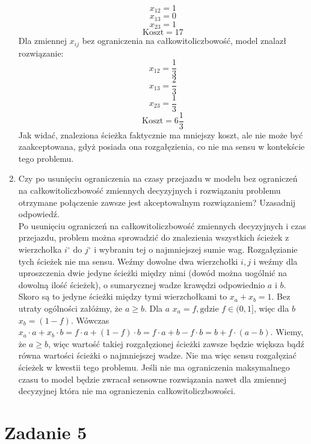 \documentclass{article}
\begin{document}
\begin{enumerate}[label=(\alph*)]
        \[x_{12} = 1\]
        \[x_{13} = 0\]
        \[x_{23} = 1\]
        \[\text{Koszt} = 17\]
        Dla zmiennej $x_{ij}$ bez ograniczenia na całkowitoliczbowość, model znalazł rozwiązanie:
        \[x_{12} = \frac{1}{3}\]
        \[x_{13} = \frac{2}{3}\]
        \[x_{23} = \frac{1}{3}\]
        \[\text{Koszt} = 6\frac{1}{3}\]
        Jak widać, znaleziona ścieżka faktycznie ma mniejszy koszt, ale nie może być zaakceptowana, gdyż posiada ona rozgałęzienia, co nie ma sensu w kontekście tego problemu.
    \item Czy po usunięciu ograniczenia na czasy przejazdu w modelu bez ograniczeń na całkowitoliczbowość zmiennych decyzyjnych i rozwiązaniu problemu otrzymane połączenie zawsze jest akceptowalnym rozwiązaniem? Uzasadnij odpowiedź.\\[0.2 cm]
    Po usunięciu ograniczeń na całkowitoliczbowość zmiennych decyzyjnych i czas przejazdu, problem można sprowadzić do znalezienia wszystkich ścieżek z wierzchołka $i^\circ$ do $j^\circ$ i wybraniu tej o najmniejszej sumie wag. Rozgałęzianie tych ścieżek nie ma sensu. Weźmy dowolne dwa wierzchołki $i, j$ i weźmy dla uproszczenia dwie jedyne ścieżki między nimi (dowód można uogólnić na dowolną ilość ścieżek), o sumarycznej wadze krawędzi odpowiednio $a$ i $b$. Skoro są to jedyne ścieżki między tymi wierzchołkami to $x_a + x_b = 1$. Bez utraty ogólności załóżmy, że $a \geq b$. Dla $a$ $x_a = f, \text{gdzie }f \in (0, 1]$, więc dla $b$ $x_b = (1 - f)$. Wówczas $x_a \cdot a + x_b \cdot b = f \cdot a + (1 - f) \cdot b = f \cdot a + b - f \cdot b = b + f \cdot (a - b)$. Wiemy, że $a \geq b$, więc wartość takiej rozgałęzionej ścieżki zawsze będzie większa bądź równa wartości ścieżki o najmniejszej wadze. Nie ma więc sensu rozgałęziać ścieżek w kwestii tego problemu. Jeśli nie ma ograniczenia maksymalnego czasu to model będzie zwracał sensowne rozwiązania nawet dla zmiennej decyzyjnej która nie ma ograniczenia całkowitoliczbowości.   
\end{enumerate}

\section{Zadanie 5}
\end{document}
